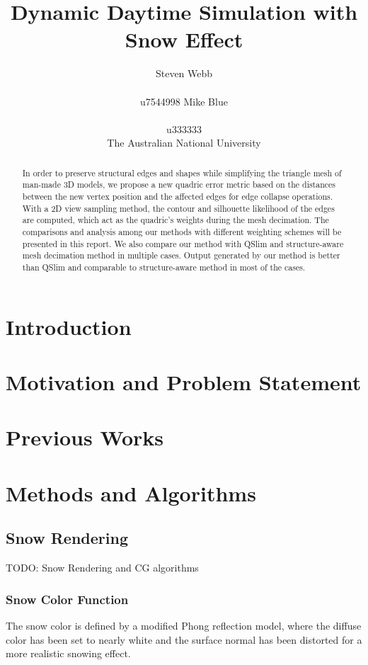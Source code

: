 \documentclass{article}
\title{Dynamic Daytime Simulation with Snow Effect}
\author{%
  Steven Webb\\\\
  u7544998 
   \And
  Mike Blue\\\\
  u333333\\
  \AND  The Australian National University 
}
\begin{document}
\maketitle


\begin{abstract}
  In order to preserve structural edges and shapes while simplifying the triangle mesh of man-made 3D models, we propose a new quadric error metric based on the distances between the new vertex position and the affected edges for edge collapse operations. With a 2D view sampling method, the contour and silhouette likelihood of the edges are computed, which act as the quadric’s weights during the mesh decimation. The comparisons and analysis among our methods with different weighting schemes will be presented in this report. We also compare our method with QSlim  and structure-aware mesh decimation method in multiple cases. Output generated by our method is better than QSlim and comparable to structure-aware method in most of the cases. 
\end{abstract}

\section{Introduction}

\section{Motivation and Problem Statement}

\section{Previous Works}

\section {Methods and Algorithms}

\subsection {Snow Rendering}
TODO: Snow Rendering and CG algorithms

\subsubsection {Snow Color Function}
The snow color is defined by a modified Phong reflection model, where the diffuse color has been set to nearly white 
and the surface normal has been distorted for a more realistic snowing effect.
\end{document}
